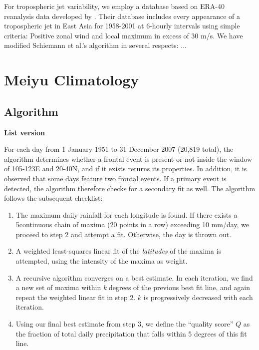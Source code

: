 \documentclass[draft,grl]{AGUTeX}
\begin{document}
\begin{article}
	For tropospheric jet variability, we employ a database based on ERA-40 reanalysis data developed by \citet{Schiemann2009}. Their database includes every appearance of a tropospheric jet in East Asia for 1958-2001 at 6-hourly intervals using simple criteria: Positive zonal wind and local maximum in excess of 30 m/s. We have modified Schiemann et al.'s algorithm in several respects: ...
	
\section{Meiyu Climatology}
\subsection{Algorithm}


\textbf{List version}

For each day from 1 January 1951 to 31 December 2007 (20,819 total), the algorithm determines whether a frontal event is present or not inside the window of 105-123E and 20-40N, and if it exists returns its properties. In addition, it is observed that some days feature two frontal events. If a primary event is detected, the algorithm therefore checks for a secondary fit as well. The algorithm follows the subsequent checklist:

\begin{enumerate}
	\item The maximum daily rainfall for each longitude is found. If there exists a 5\textdegree continuous chain of maxima (20 points in a row) exceeding 10 mm/day, we proceed to step 2 and attempt a fit. Otherwise, the day is thrown out.
	
	\item A weighted least-squares linear fit of the \textit{latitudes} of the maxima is attempted, using the intensity of the maxima as weight.
	
	\item A recursive algorithm converges on a best estimate. In each iteration, we find a new set of maxima within \textit{k} degrees of the previous best fit line, and again repeat the weighted linear fit in step 2. $k$ is progressively decreased with each iteration.
	
	\item Using our final best estimate from step 3, we define the ``quality score'' $Q$ as the fraction of total daily precipitation that falls within 5 degrees of this fit line.
	

\end{enumerate}
\end{article}
\end{document}
